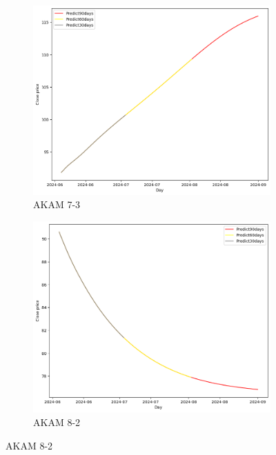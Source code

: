 \documentclass{ieeeojies}
\begin{document}
\begin{figure}[H]
    \centering
    \begin{subfigure}[b]{0.33\linewidth}
        \centering
        \includegraphics[width=\linewidth]{LSTM Plot/AKAM_LSTM_7_3-90.png}
        \caption{AKAM 7-3}
        \label{fig:akam-7-3}
    \end{subfigure}%
    \hfill
    \begin{subfigure}[b]{0.33\linewidth}
        \centering
        \includegraphics[width=\linewidth]{LSTM Plot/AKAM_LSTM_8_2-90.png}
        \caption{AKAM 8-2}
        \label{fig:akam-8-2}
    \end{subfigure}%

\end{figure}
\end{document}
